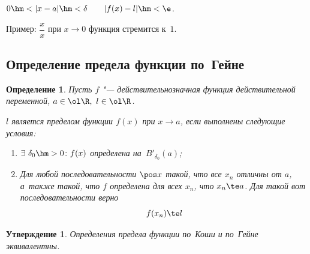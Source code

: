 \documentclass[a4paper,10pt,twoside]{article}
\newtheorem{Def}{Определение}[section]
\newtheorem{Ut}{Утверждение}[section]
\begin{document}
$0\hm<|x-a|\hm<\delta\qquad |f(x)-l|\hm<\e$.

Пример: $\dfrac xx$ при $x\to 0$ функция стремится к~$1$.

\subsection{Определение предела функции по~Гейне}

\begin{Def}\label{ge}
Пусть $f$ "--- действительнозначная функция действительной переменной, $a\in\ol\R,\ l\in\ol\R$.

$l$ является пределом функции $f(x)$ при $x\to a$, если выполнены следующие условия:

\begin{enumerate}
    \item   $\exists\ \delta_0\hm>0\colon f(x)$ определена на~$B'_{\delta_0}(a)$;

    \item Для любой последовательности $ \pos x$ такой, что все $x_n$ отличны от $a$, а~также такой,
     что $f$ определена для всех $x_n$, что $x_n\te a$.
     Для такой вот последовательности верно
        $$f(x_n)\te l$$
\end{enumerate}


\end{Def}

\begin{Ut}\label{KoGe}
Определения предела функции по~Коши и по~Гейне эквивалентны.
\end{Ut}
\end{document}
